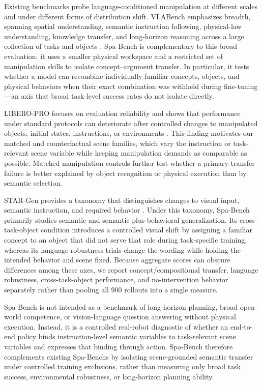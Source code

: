 Existing benchmarks probe language-conditioned manipulation at different scales and under different forms of distribution shift. VLABench emphasizes breadth, spanning spatial understanding, semantic instruction following, physical-law understanding, knowledge transfer, and long-horizon reasoning across a large collection of tasks and objects \cite{zhang2024vlabench}. Spa-Bench is complementary to this broad evaluation: it uses a smaller physical workspace and a restricted set of manipulation skills to isolate concept--argument transfer. In particular, it tests whether a model can recombine individually familiar concepts, objects, and physical behaviors when their exact combination was withheld during fine-tuning---an axis that broad task-level success rates do not isolate directly.

LIBERO-PRO focuses on evaluation reliability and shows that performance under standard protocols can deteriorate after controlled changes to manipulated objects, initial states, instructions, or environments \cite{zhou2025liberopro}. This finding motivates our matched and counterfactual scene families, which vary the instruction or task-relevant scene variable while keeping manipulation demands as comparable as possible. Matched manipulation controls further test whether a primary-transfer failure is better explained by object recognition or physical execution than by semantic selection.

STAR-Gen provides a taxonomy that distinguishes changes to visual input, semantic instruction, and required behavior \cite{gao2026stargen}. Under this taxonomy, Spa-Bench primarily studies semantic and semantic-plus-behavioral generalization. Its cross-task-object condition introduces a controlled visual shift by assigning a familiar concept to an object that did not serve that role during task-specific training, whereas its language-robustness trials change the wording while holding the intended behavior and scene fixed. Because aggregate scores can obscure differences among these axes, we report concept/compositional transfer, language robustness, cross-task-object performance, and no-intervention behavior separately rather than pooling all 900 rollouts into a single measure.

Spa-Bench is not intended as a benchmark of long-horizon planning, broad open-world competence, or vision-language question answering without physical execution. Instead, it is a controlled real-robot diagnostic of whether an end-to-end policy binds instruction-level semantic variables to task-relevant scene variables and expresses that binding through action. Spa-Bench therefore complements existing Spa-Benchs by isolating scene-grounded semantic transfer under controlled training exclusions, rather than measuring only broad task success, environmental robustness, or long-horizon planning ability.
